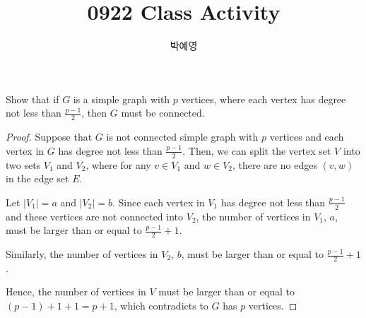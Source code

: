 \documentclass[a4paper, 12pt]{article}
\title{0922 Class Activity}
\author{박예영}
\begin{document}
\maketitle
\begin{mdframed}
Show that if $G$ is a simple graph with $p$ vertices, where each vertex has degree not less than $\displaystyle \frac{p-1}{2}$, then $G$ must be connected.
\end{mdframed}
\doublespacing

\begin{proof}
Suppose that $G$ is not connected simple graph with $p$ vertices and each vertex in $G$ has degree not less than $\displaystyle \frac{p-1}{2}$. Then, we can split the vertex set $V$ into two sets $V_1$ and $V_2$, where for any $v \in V_1$ and $w \in V_2$, there are no edges $(v, w)$ in the edge set $E$.

Let $|V_1| = a$ and $|V_2| = b$. Since each vertex in $V_1$ has degree not less than $\displaystyle \frac{p-1}{2}$ and these vertices are not connected into $V_2$, the number of vertices in $V_1$, $a$, must be larger than or equal to $\displaystyle \frac{p-1}{2} + 1$.

Similarly, the number of vertices in $V_2$, $b$, must be larger than or equal to $\displaystyle \frac{p-1}{2} + 1$.

Hence, the number of vertices in $V$ must be larger than or equal to $\displaystyle (p-1) + 1 + 1 = p+1$, which contradicts to $G$ has $p$ vertices.

\end{proof}
\end{document}
